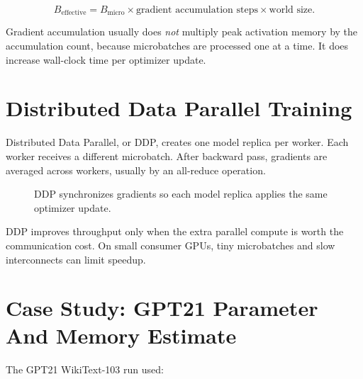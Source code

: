 \[
B_{\text{effective}} =
B_{\text{micro}} \times
\text{gradient accumulation steps} \times
\text{world size}.
\]

Gradient accumulation usually does \emph{not} multiply peak activation memory by the
accumulation count, because microbatches are processed one at a time. It does increase
wall-clock time per optimizer update.

\section{Distributed Data Parallel Training}

Distributed Data Parallel, or DDP, creates one model replica per worker. Each worker
receives a different microbatch. After backward pass, gradients are averaged across
workers, usually by an all-reduce operation.

\begin{figure}[htbp]
\centering
{}
\caption{DDP synchronizes gradients so each model replica applies the same optimizer update.}
\end{figure}

DDP improves throughput only when the extra parallel compute is worth the communication
cost. On small consumer GPUs, tiny microbatches and slow interconnects can limit speedup.

\section{Case Study: GPT21 Parameter And Memory Estimate}

The GPT21 WikiText-103 run used:

